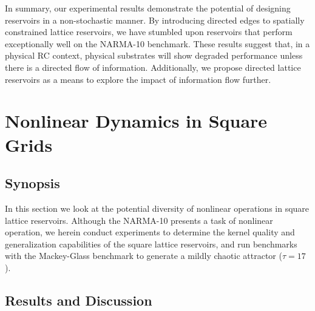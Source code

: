 In summary, our experimental results demonstrate the potential of designing
reservoirs in a non-stochastic manner. By introducing directed edges to
spatially constrained lattice reservoirs, we have stumbled upon reservoirs that
perform exceptionally well on the NARMA-10 benchmark. These results suggest
that, in a physical RC context, physical substrates will show degraded
performance unless there is a directed flow of information. Additionally, we
propose directed lattice reservoirs as a means to explore the impact of
information flow further.

\section{Nonlinear Dynamics in Square Grids}

\subsection{Synopsis}

In this section we look at the potential diversity of nonlinear operations in
square lattice reservoirs. Although the NARMA-10 presents a task of nonlinear
operation, we herein conduct experiments to determine the kernel quality and
generalization capabilities of the square lattice reservoirs, and run benchmarks
with the Mackey-Glass benchmark to generate a mildly chaotic attractor ($\tau =
17$).

\subsection{Results and Discussion}

